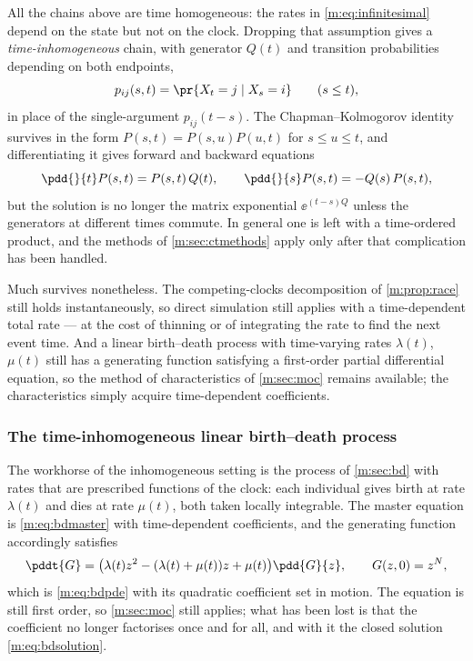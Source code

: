 All the chains above are time homogeneous: the rates in \cref{m:eq:infinitesimal}
depend on the state but not on the clock. Dropping that assumption gives a
\emph{time-inhomogeneous} chain, with generator $Q(t)$ and transition
probabilities depending on both endpoints,
\begin{equation}
\label{m:eq:inhomogtrans}
p_{ij}(s,t) = \pr{X_t=j\mid X_s=i}
\qquad(s\le t),
\end{equation}
in place of the single-argument $p_{ij}(t-s)$. The Chapman--Kolmogorov identity
survives in the form $P(s,t) = P(s,u)P(u,t)$ for $s\le u\le t$, and differentiating
it gives forward and backward equations
\begin{equation}
\label{m:eq:inhomogkolmogorov}
\pdd{}{t}P(s,t) = P(s,t)\,Q(t),
\qquad
\pdd{}{s}P(s,t) = -Q(s)\,P(s,t),
\end{equation}
but the solution is no longer the matrix exponential $\ee^{(t-s)Q}$ unless the
generators at different times commute. In general one is left with a
time-ordered product, and the methods of \cref{m:sec:ctmethods} apply only after
that complication has been handled.

Much survives nonetheless. The competing-clocks decomposition of
\cref{m:prop:race} still holds instantaneously, so direct simulation still applies
with a time-dependent total rate --- at the cost of thinning or of integrating the
rate to find the next event time. And a linear birth--death process with
time-varying rates $\lambda(t)$, $\mu(t)$ still has a generating function
satisfying a first-order partial differential equation, so the method of
characteristics of \cref{m:sec:moc} remains available; the characteristics simply
acquire time-dependent coefficients.

\subsubsection{The time-inhomogeneous linear birth--death process}
\label{m:sec:tibd}

The workhorse of the inhomogeneous setting is the process of \cref{m:sec:bd} with
rates that are prescribed functions of the clock: each individual gives birth at
rate $\lambda(t)$ and dies at rate $\mu(t)$, both taken locally integrable. The
master equation is \cref{m:eq:bdmaster} with time-dependent coefficients, and the
generating function accordingly satisfies
\begin{equation}
\label{m:eq:tibdpde}
\pddt{G} = \bigl(\lambda(t)z^2-(\lambda(t)+\mu(t))z+\mu(t)\bigr)\pdd{G}{z},
\qquad
G(z,0)=z^N ,
\end{equation}
which is \cref{m:eq:bdpde} with its quadratic coefficient set in motion. The
equation is still first order, so \cref{m:sec:moc} still applies; what has been
lost is that the coefficient no longer factorises once and for all, and with it
the closed solution \cref{m:eq:bdsolution}.


